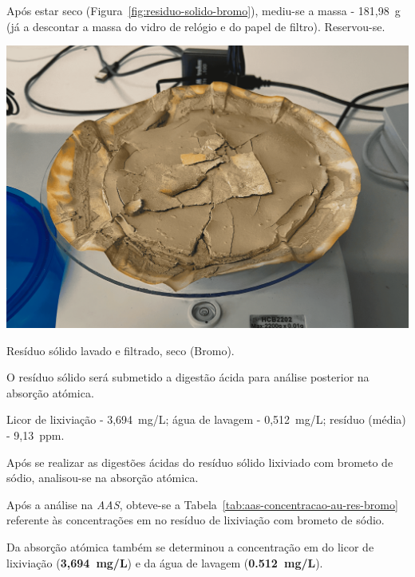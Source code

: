 Após estar seco (Figura~\ref{fig:residuo-solido-bromo}), mediu-se a massa - 181,98~g (já a descontar a massa do vidro de relógio e do papel de filtro).
Reservou-se.

\begin{marginfigure}[-1cm]
    \centering
    \includegraphics[width=0.9\linewidth]{figures/residuo solido lavado e filtrado - bromo}
    \caption{Resíduo sólido lavado e filtrado, seco (Bromo).}
    \label{fig:residuo-solido-bromo}
\end{marginfigure}

O resíduo sólido será submetido a digestão ácida para análise posterior na absorção atómica.

 Licor de lixiviação - 3,694~mg/L; água de lavagem - 0,512~mg/L; resíduo (média) - 9,13~ppm.

\hrulefill


Após se realizar as digestões ácidas do resíduo sólido lixiviado com brometo de sódio, analisou-se na absorção atómica.

Após a análise na \emph{AAS}, obteve-se a Tabela~\ref{tab:aas-concentracao-au-res-bromo} referente às concentrações em  no resíduo de lixiviação com brometo de sódio.

Da absorção atómica também se determinou a concentração em  do licor de lixiviação (\textbf{3,694~mg/L}) e da água de lavagem (\textbf{0.512~mg/L}).

\newpage

